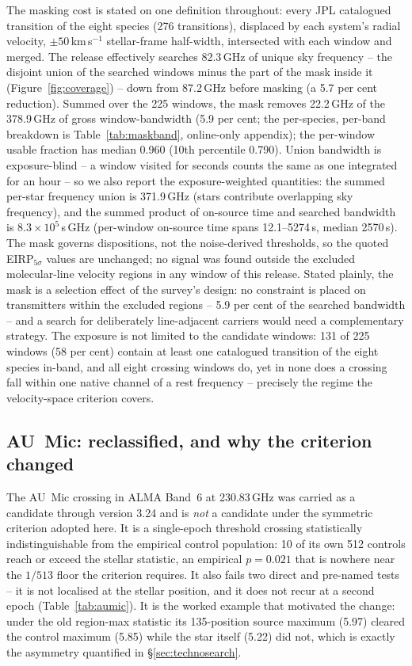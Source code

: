 \documentclass{openjournal}
\begin{document}
The masking cost is stated on one definition throughout: every JPL
catalogued transition of the eight species (276 transitions),
displaced by each system's radial velocity, $\pm50$\,km\,s$^{-1}$
stellar-frame half-width, intersected with each window and merged.
The release effectively searches 82.3\,GHz of unique sky frequency --
the disjoint union of the searched windows minus the part of the mask
inside it (Figure~\ref{fig:coverage}) -- down from 87.2\,GHz before
masking (a 5.7 per cent reduction). Summed over the 225 windows, the
mask removes 22.2\,GHz of the 378.9\,GHz of gross window-bandwidth
(5.9 per cent; the per-species, per-band breakdown is
Table~\ref{tab:maskband}, online-only appendix); the per-window
usable fraction has median 0.960 (10th percentile 0.790). Union bandwidth is exposure-blind -- a window
visited for seconds counts the same as one integrated for an hour --
so we also report the exposure-weighted quantities: the summed
per-star frequency union is 371.9\,GHz (stars contribute overlapping
sky frequency), and the summed product of on-source time and searched
bandwidth is $8.3\times10^{5}$\,s\,GHz (per-window on-source time
spans 12.1--5274\,s, median 2570\,s). The mask governs dispositions,
not the noise-derived thresholds, so the quoted EIRP$_{5\sigma}$
values are unchanged; no signal was found outside the excluded
molecular-line velocity regions in any window of this release.
Stated plainly, the mask is a selection effect of the survey's
design: no constraint is placed on transmitters within the excluded
regions -- 5.9 per cent of the searched bandwidth -- and a search for
deliberately line-adjacent carriers would need a complementary
strategy. The exposure is not limited to the candidate windows: 131 of
225 windows (58 per cent) contain at least one catalogued transition
of the eight species in-band, and all eight crossing windows do, yet
in none does a crossing fall within one native channel of a rest
frequency -- precisely the regime the velocity-space criterion
covers.

\subsection{AU~Mic: reclassified, and why the criterion changed}
\label{sec:aumic}

The AU~Mic crossing in ALMA Band~6 at 230.83\,GHz was carried as a
candidate through version 3.24 and is \emph{not} a candidate under the
symmetric criterion adopted here. It is a single-epoch threshold
crossing statistically indistinguishable from the empirical control
population: 10 of its own 512 controls reach or exceed the stellar
statistic, an empirical $p=0.021$ that is nowhere near the $1/513$
floor the criterion requires. It also fails two direct and pre-named
tests -- it is not localised at the stellar position, and it does not
recur at a second epoch (Table~\ref{tab:aumic}). It is the worked
example that motivated the change: under the old region-max statistic
its 135-position source maximum (5.97) cleared the control maximum
(5.85) while the star itself (5.22) did not, which is exactly the
asymmetry quantified in \S\ref{sec:technosearch}.
\end{document}
